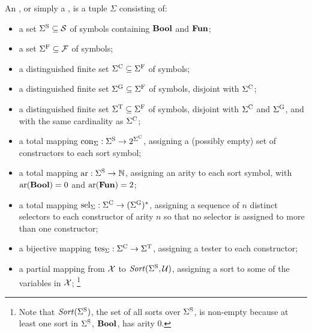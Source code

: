 \begin{definition}
\label{def:signature}
An , or simply a ,
is a tuple $\Sigma$ consisting of:

\begin{itemize}
\item
a set $\Sigma^\mathrm{S} \subseteq \mathcal{S}$ of  symbols containing $\textbf{Bool}$ and $\textbf{Fun}$;

\item
a set $\Sigma^\mathrm{F} \subseteq \mathcal{F}$ of  symbols;

\item
a distinguished finite set $\Sigma^\mathrm{C} \subseteq \Sigma^\mathrm{F}$ 
of  symbols;

\item
a distinguished finite set $\Sigma^\mathrm{G} \subseteq \Sigma^\mathrm{F}$ 
of  symbols,
disjoint with $\Sigma^\mathrm{C}$;

\item
a distinguished finite set $\Sigma^\mathrm{T} \subseteq \Sigma^\mathrm{F}$ 
of  symbols,
disjoint with $\Sigma^\mathrm{C}$ and $\Sigma^\mathrm{G}$, and with the same cardinality
as $\Sigma^\mathrm{C}$;

\item
a total mapping $\mathrm{con}_\Sigma:\Sigma^\mathrm{S} \to 2^{\Sigma^\mathrm{C}}$,
assigning a (possibly empty) set of constructors to each sort symbol;

\item
a total mapping $\mathrm{ar}:\Sigma^\mathrm{S} \to \mathbb{N}$,
assigning an arity to each sort symbol,
with $\mathrm{ar}(\textbf{Bool}) = 0$ and $\mathrm{ar}(\textbf{Fun}) = 2$;

\item
a total mapping $\mathrm{sel}_\Sigma:\Sigma^\mathrm{C} \to (\Sigma^\mathrm{G})^*$,
assigning a sequence of $n$ distinct selectors to each constructor of arity $n$
so that no selector is assigned to more than one constructor;

\item
a bijective mapping $\mathrm{tes}_\Sigma:\Sigma^\mathrm{C} \to \Sigma^\mathrm{T}$,
assigning a tester to each constructor;

\item
a partial mapping from $\mathcal{X}$ to $\mathit{Sort}(\Sigma^\mathrm{S}, \mathcal{U})$,
assigning a sort to some of the variables in $\mathcal{X}$;%
\footnote{%
Note that $\mathit{Sort}(\Sigma^\mathrm{S})$, the set of all sorts over $\Sigma^\mathrm{S}$, is 
non-empty because at least one sort in $\Sigma^\mathrm{S}$, $\textbf{Bool}$, has arity 0.
}


\end{itemize}
\end{definition}

